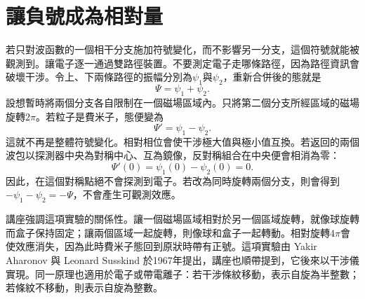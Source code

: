 \section{讓負號成為相對量}

若只對波函數的一個相干分支施加符號變化，而不影響另一分支，這個符號就能被觀測到。讓電子逐一通過雙路徑裝置。不要測定電子走哪條路徑，因為路徑資訊會破壞干涉。令上、下兩條路徑的振幅分別為\(\psi_1\)與\(\psi_2\)，重新合併後的態就是
\begin{equation}
\Psi=\psi_1+\psi_2.
\end{equation}
設想暫時將兩個分支各自限制在一個磁場區域內。只將第二個分支所經區域的磁場旋轉\(2\pi\)。若粒子是費米子，態便變為
\begin{equation}
\Psi'=\psi_1-\psi_2.
\end{equation}
這就不再是整體符號變化。相對相位會使干涉極大值與極小值互換。若返回的兩個波包以探測器中央為對稱中心、互為鏡像，反對稱組合在中央便會相消為零：
\begin{equation}
\Psi'(0)=\psi_1(0)-\psi_2(0)=0.
\end{equation}
因此，在這個對稱點絕不會探測到電子。若改為同時旋轉兩個分支，則會得到\(-\psi_1-\psi_2=-\Psi\)，不會產生可觀測效應。

講座強調這項實驗的關係性。讓一個磁場區域相對於另一個區域旋轉，就像球旋轉而盒子保持固定；讓兩個區域一起旋轉，則像球和盒子一起轉動。相對旋轉\(4\pi\)會使效應消失，因為此時費米子態回到原狀時帶有正號。這項實驗由 Yakir Aharonov 與 Leonard Susskind 於1967年提出，講座也順帶提到，它後來以干涉儀實現。同一原理也適用於電子或帶電離子：若干涉條紋移動，表示自旋為半整數；若條紋不移動，則表示自旋為整數。

\begin{classroomqa}
\end{classroomqa}

\begin{classroomqa}
\end{classroomqa}

\begin{classroomqa}
\end{classroomqa}

